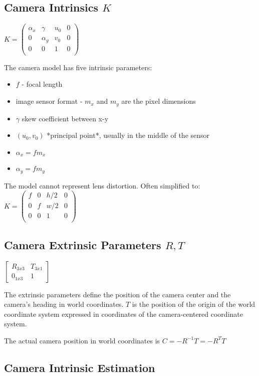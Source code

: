 \subsection{Camera Intrinsics $K$}

$K = \left( \begin{matrix} 
\alpha_x & \gamma & u_0 & 0 \\
0 & \alpha_y  & v_0 & 0 \\
0 & 0 &  1 & 0 \\
\end{matrix}
\right) $

The camera model has five intrinsic parameters:
\begin{itemize}
\item $f$ - focal length
\item  image sensor format - $m_x$ and $m_y$ are the pixel dimensions
\item  $\gamma$ skew coefficient between x-y
\item  $(u_0,v_0)$ *principal point*, usually in the middle of the sensor
\item  $\alpha_x = f m_x $
\item  $\alpha_y = f m_y $
\end{itemize}
The model cannot represent lens distortion. Often simplified to:
$ K = \left( \begin{matrix} 
f & 0 & h/2 & 0 \\
0 & f  & w/2 & 0 \\
0 & 0 &  1 & 0 \\
\end{matrix}
\right) $

\subsection{Camera Extrinsic Parameters $R,T$}

$ \left[ 
\begin{matrix} 
R_{3x3} & T_{3x1} \\
0_{1x3} & 1 
\end{matrix}
\right] $

The extrinsic parameters define the position of the camera center and the camera's heading in world coordinates. $T$ is the position of the origin of the world coordinate system expressed in coordinates of the camera-centered coordinate system. 

The actual camera position in world coordinates is $C = -R^{-1}T=-R^{T}T $

\subsection{Camera Intrinsic Estimation}

